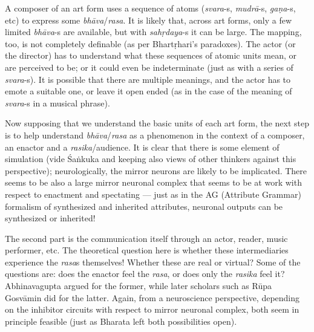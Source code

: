 A composer of an art form uses a sequence of atoms (\textsl{svara}-s, \hbox{\textsl{mudrā}-s}, \textsl{gaṇa}-s, etc) to express some \textsl{bhāva}/\textsl{rasa}. It is likely that, across art forms, only a few limited \textsl{bhāva}-s are available, but with \textsl{sahṛdaya}-s it can be large. The mapping, too, is not completely definable (as per Bhartṛhari’s paradoxes). The actor (or the director) has to understand what these sequences of atomic units mean, or are perceived to be; or it could even be indeterminate (just as with a series of \textsl{svara}-s). It is possible that there are multiple meanings, and the actor has to emote a suitable one, or leave it open ended (as in the case of the meaning of \textsl{svara}-s in a musical phrase).

Now supposing that we understand the basic units of each art form, the next step is to help understand \textsl{bhāva}/\textsl{rasa} as a phenomenon in the context of a composer, an enactor and a \textsl{rasika}/audience. It is clear that there is some element of simulation (vide Śaṅkuka and keeping also views of other thinkers against this perspective); neurologically, the mirror neurons are likely to be implicated. There seems to be also a large mirror neuronal complex that seems to be at work with respect to enactment and spectating --- just as in the AG (Attribute Grammar) formalism of synthesized and inherited attributes, neuronal outputs can be synthesized or inherited!

The second part is the communication itself through an actor, reader, music performer, etc. The theoretical question here is whether these intermediaries experience the \textsl{rasa}s themselves! Whether these are real or virtual? Some of the questions are: does the enactor feel the \textsl{rasa}, or does only the \textsl{rasika} feel it? Abhinavagupta argued for the former, while later scholars such as Rūpa Gosvāmin did for the latter. Again, from a neuroscience perspective, depending on the inhibitor circuits with respect to mirror neuronal complex, both seem in principle feasible (just as Bharata left both possibilities open).

